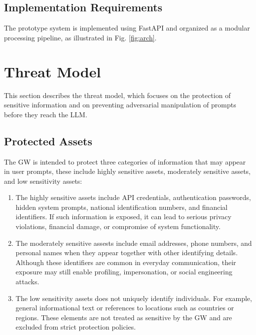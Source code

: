 \documentclass[conference]{IEEEtran}
\begin{document}
\subsection{Implementation Requirements}

The prototype system is implemented using FastAPI and organized as a modular processing pipeline, as illustrated in Fig. \ref{fig:arch}.



\section{Threat Model}
\label{sec:threatmodel}

This section describes the threat model, which focuses on the protection of sensitive information and on preventing adversarial manipulation of prompts before they reach the LLM.

\subsection{Protected Assets}

The GW is intended to protect three categories of information that may appear in user prompts, these include highly sensitive assets, moderately sensitive assets, and low sensitivity assets:

\begin{enumerate}
    \item The highly sensitive assets include API credentials, authentication passwords, hidden system prompts, national identification numbers, and financial identifiers. If such information is exposed, it can lead to serious privacy violations, financial damage, or compromise of system functionality.
    \item The moderately sensitive assests include email addresses, phone numbers, and personal names when they appear together with other identifying details. Although these identifiers are common in everyday communication, their exposure may still enable profiling, impersonation, or social engineering attacks.
    \item The low sensitivity assets does not uniquely identify individuals. For example, general informational text or references to locations such as countries or regions. These elements are not treated as sensitive by the GW and are excluded from strict protection policies.
\end{enumerate}
\end{document}
